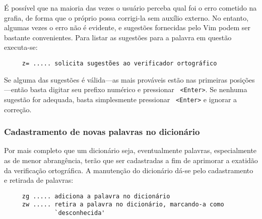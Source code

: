É possível que na maioria das vezes o usuário perceba qual foi o erro cometido
na grafia, de forma que o próprio possa corrigi-la sem auxílio externo. No
entanto, algumas vezes o erro não é evidente, e sugestões fornecidas pelo Vim
podem ser bastante convenientes. Para listar as sugestões para a palavra
em questão executa-se:

\begin{verbatim}
     z= ..... solicita sugestões ao verificador ortográfico
\end{verbatim}

Se alguma das sugestões é válida---as mais prováveis estão nas primeiras
posições---então basta digitar seu prefixo numérico e pressionar {\tt
<Enter>}. Se nenhuma sugestão for adequada, basta simplesmente pressionar {\tt
<Enter>} e ignorar a correção.

\subsubsection{Cadastramento de novas palavras no dicionário}

Por mais completo que um dicionário seja, eventualmente palavras,
especialmente as de menor abrangência, terão que ser cadastradas a fim de
aprimorar a exatidão da verificação ortográfica. A manutenção do dicionário 
dá-se pelo cadastramento e retirada de palavras:

\begin{verbatim}
     zg ..... adiciona a palavra no dicionário
     zw ..... retira a palavra no dicionário, marcando-a como 
              `desconhecida'
\end{verbatim}
